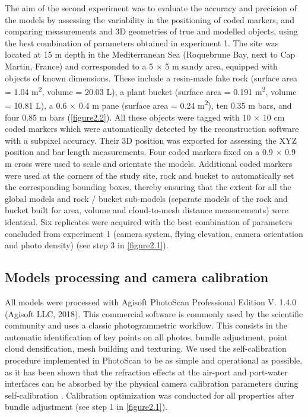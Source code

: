 The aim of the second experiment was to evaluate the accuracy and precision of the models by assessing the variability in the positioning of coded markers, and comparing measurements and 3D geometries of true and modelled objects, using the best combination of parameters obtained in experiment 1. The site was located at 15 m depth in the Mediterranean Sea (Roquebrune Bay, next to Cap Martin, France) and corresponded to a 5 $\times$ 5 m sandy area, equipped with objects of known dimensions. These include a resin-made fake rock (surface area = 1.04 m\textsuperscript{2}, volume = 20.03 L), a plant bucket (surface area = 0.191 m\textsuperscript{2}, volume = 10.81 L), a 0.6 $\times$ 0.4 m pane (surface area = 0.24 m\textsuperscript{2}), ten 0.35 m bars, and four 0.85 m bars (\autoref{figure2.2}). All these objects were tagged with 10 $\times$ 10 cm coded markers which were automatically detected by the reconstruction software with a subpixel accuracy. Their 3D position was exported for assessing the XYZ position and bar length measurements. Four coded markers fixed on a 0.9 $\times$ 0.9 m cross were used to scale and orientate the models. Additional coded markers were used at the corners of the study site, rock and bucket to automatically set the corresponding bounding boxes, thereby ensuring that the extent for all the global models and rock / bucket sub-models (separate models of the rock and bucket built for area, volume and cloud-to-mesh distance measurements) were identical. Six replicates were acquired with the best combination of parameters concluded from experiment 1 (camera system, flying elevation, camera orientation and photo density) (see step 3 in \autoref{figure2.1}).

\subsection{Models processing and camera calibration}\label{chapitre2_2.2}
All models were processed with Agisoft PhotoScan Professional Edition V. 1.4.0 (Agisoft LLC, 2018). This commercial software is commonly used by the scientific community \citep{burns_integrating_2015, burns_utilizing_2015, figueira_accuracy_2015, burns_assessing_2016, guo_accuracy_2016,   casella_mapping_2017, mizuno_simple_2017} and uses a classic photogrammetric workflow. This consists in the automatic identification of key points on all photos, bundle adjustment, point cloud densification, mesh building and texturing. We used the self-calibration procedure implemented in PhotoScan to be as simple and operational as possible, as it has been shown that the refraction effects at the air-port and port-water interfaces can be absorbed by the physical camera calibration parameters during self-calibration \citep{shortis_calibration_2015}. Calibration optimization was conducted for all properties after bundle adjustment (see step 1 in \autoref{figure2.1}).

